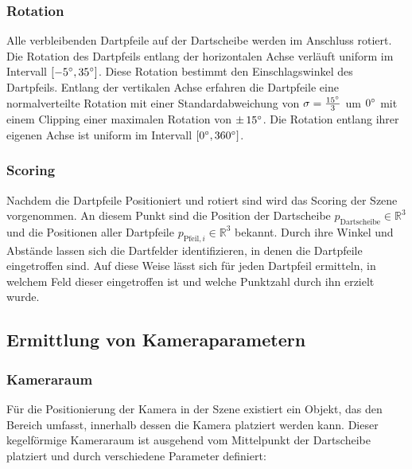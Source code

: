 \subsubsection{Rotation}

Alle verbleibenden Dartpfeile auf der Dartscheibe werden im Anschluss rotiert. Die Rotation des Dartpfeils entlang der horizontalen Achse verläuft uniform im Intervall $[-5^{\circ}, 35^{\circ}]$. Diese Rotation bestimmt den Einschlagswinkel des Dartpfeils. Entlang der vertikalen Achse erfahren die Dartpfeile eine normalverteilte Rotation mit einer Standardabweichung von $\sigma = \frac{15^{\circ}}{3}$ um $0^{\circ}$ mit einem Clipping einer maximalen Rotation von $\pm\,15^{\circ}$. Die Rotation entlang ihrer eigenen Achse ist uniform im Intervall $[0^{\circ}, 360^{\circ}]$.

\subsubsection{Scoring}

Nachdem die Dartpfeile Positioniert und rotiert sind wird das Scoring der Szene vorgenommen. An diesem Punkt sind die Position der Dartscheibe $p_\text{Dartscheibe} \in \mathbb{R}^3$ und die Positionen aller Dartpfeile $p_{\text{Pfeil}, i} \in \mathbb{R}^3$ bekannt. Durch ihre Winkel und Abstände lassen sich die Dartfelder identifizieren, in denen die Dartpfeile eingetroffen sind. Auf diese Weise lässt sich für jeden Dartpfeil ermitteln, in welchem Feld dieser eingetroffen ist und welche Punktzahl durch ihn erzielt wurde.

\subsection{Ermittlung von Kameraparametern}  %
\label{sec:ermittlung_kameraparamater}

\subsubsection{Kameraraum}

Für die Positionierung der Kamera in der Szene existiert ein Objekt, das den Bereich umfasst, innerhalb dessen die Kamera platziert werden kann. Dieser kegelförmige Kameraraum ist ausgehend vom Mittelpunkt der Dartscheibe platziert und durch verschiedene Parameter definiert:

